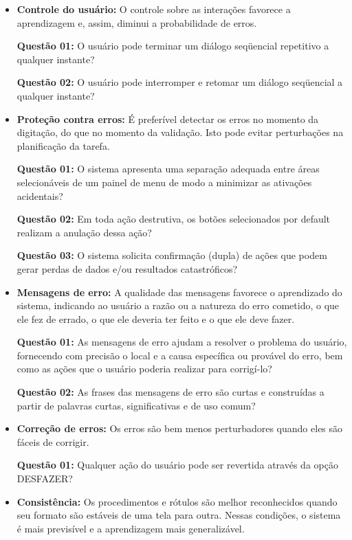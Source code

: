 \begin{itemize}
		\item \textbf{Controle do usuário:}	O controle sobre as interações favorece a aprendizagem e, assim, diminui a probabilidade de erros. 

		\textbf{Questão 01:} O usuário pode terminar um diálogo seqüencial repetitivo a qualquer instante? 
    
    	\textbf{Questão 02:} O usuário pode interromper e retomar um diálogo seqüencial a qualquer instante? 
	
    	\item \textbf{Proteção contra erros:} É preferível detectar os erros no momento da digitação, do que no momento da validação. Isto pode evitar perturbações na planificação da tarefa.

		\textbf{Questão 01:} O sistema apresenta uma separação adequada entre áreas selecionáveis de um painel de menu de modo a minimizar as ativações acidentais? 
    
    	\textbf{Questão 02:} Em toda ação destrutiva, os botões selecionados por default realizam a anulação dessa ação? 
   
   		\textbf{Questão 03:} O sistema solicita confirmação (dupla) de ações que podem gerar perdas de dados e/ou resultados catastróficos? 

   		\item \textbf{Mensagens de erro:} A qualidade das mensagens favorece o aprendizado do sistema, indicando ao usuário a razão ou a natureza do erro cometido, o que ele fez de errado, o que ele deveria ter feito e o que ele deve fazer.

		\textbf{Questão 01:} As mensagens de erro ajudam a resolver o problema do usuário, fornecendo com precisão o local e a causa específica ou provável do erro, bem como as ações que o usuário poderia realizar para corrigí-lo? 
    	
    	\textbf{Questão 02:} As frases das mensagens de erro são curtas e construídas a partir de palavras curtas, significativas e de uso comum? 

    	\item \textbf{Correção de erros:} Os erros são bem menos perturbadores quando eles são fáceis de corrigir.

		\textbf{Questão 01:} Qualquer ação do usuário pode ser revertida através da opção DESFAZER? 

		\item \textbf{Consistência:} Os procedimentos e rótulos são melhor reconhecidos quando seu formato são estáveis de uma tela para outra. Nessas condições, o sistema é mais previsível e a aprendizagem mais generalizável.


\end{itemize}
